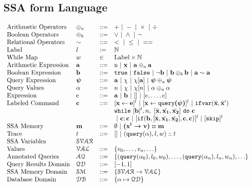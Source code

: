 \documentclass[a4paper,11pt]{article}
\begin{document}
\subsection{SSA form Language}
\[
\begin{array}{llll}
 \mbox{Arithmetic Operators} 
& \oplus_a & ::= & + ~|~ - ~|~ \times 
%
~|~ \div \\  
\mbox{Boolean Operators} 
& \oplus_b & ::= & \lor ~|~ \land ~|~ \neg
\\
\mbox{Relational Operators} 
& \sim & ::= & < ~|~ \leq ~|~ == 
\\  
%
\mbox{Label} 
& l & := & \mathbb{N} 
\\ 
%
\mbox{While Map} 
& w & \in & \mbox{Label} \times \mathbb{N} 
\\
%
\mbox{Arithmetic Expression} 
& \saexpr & ::= & 
\textrm{n} ~|~ \ssa{x} ~|~ \saexpr \oplus_a \saexpr  
\\
%
\mbox{Boolean Expression} & \sbexpr & ::= & 
	\etrue ~|~ \efalse  ~|~ \neg \sbexpr
	 ~|~ \sbexpr \oplus_b \sbexpr
	~|~ \saexpr \sim \saexpr 
	\\
%
\mbox{Query Expression} & \ssa{\qexpr} & ::= 
& { \saexpr ~|~ \chi ~|~ \chi[\saexpr] ~|~ \ssa{\qexpr} \oplus_a \ssa{\qexpr}} 
\\
%
\mbox{Query Values} & \qval & ::= 
& { n ~|~ \chi ~|~ \chi[n] ~|~ \qval \oplus_a  \qval }
\\
%
\mbox{Expression} & \sexpr & ::= & \saexpr \sep \sbexpr ~|~ [] ~|~ [\expr, \dots, \expr]
\\	
%
\mbox{Labeled Command} 
& \ssa{c} & ::= &   [\assign {\ssa{x}}{ \ssa{\expr}}]^{l} ~|~  [\assign {\ssa{x} } {\ssa{\query(\qexpr)}}]^{l}
%
~|~  {{\eifvar(\bar{\ssa{x}}, \bar{\ssa{x}}')}} 
\\ 
&&& 
{\ewhile ~ [ \sbexpr ]^{l} , n,
~ 
[\bar{\ssa{x}}, \bar{\ssa{x_1}}, \bar{\ssa{x_2}}] 
~ \edo ~  \ssa{c} }
\\
&&&
~|~ \ssa{c};\ssa{c}  
~|~ [\eif(\sbexpr, [\bar{\ssa{x}}, \bar{\ssa{x_1}}, \bar{\ssa{x_2}}] , \ssa{c}, \ssa{c})]^l 
~|~ [\eskip]^{l} 
\\
%
\mbox{SSA Memory} 
& \ssa{m} & ::= & \emptyset ~|~ \ssa{ ({x^{l}} \to v) :: m } 
\\
%
\mbox{Trace} & t 
& ::= & [] ~|~ {{(\query(\qval), l , w ) :: t}}
\\
%
\mbox{SSA Variables} 
& \mathcal{SVAR}  &  & 
%
\\
\mbox{Values} 
& \mathcal{VAL}  & ::= & \{ v_0, \ldots, v_n, \ldots \}
%
\\
\mbox{Annotated Queries} & \mathcal{AQ}  & 
::= & {\{( \query(\qval_0), l_0, w_0), \ldots, (\query(\qval_n), l_n, w_n), \ldots \} } 
\\
%
\mbox{{Query Results Domain}}
& \qdom & ::= & {[-1,1]}
\\
%
\mbox{{SSA Memory Domain}}
& {\mathcal{SM}} & ::= & {\left\{ \mathcal{SVAR} \to \mathcal{VAL} \right\}}
\\
%
\mbox{{Database Domain}}
& \dbdom & ::= & {\left\{ \qval \mapsto \qdom \right\}}
%
%
\end{array}
\]
\end{document}
